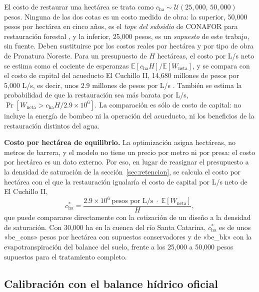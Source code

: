 El costo de restaurar una hectárea se trata como $c_{\text{ha}}\sim\mathcal U(25{,}000,\,50{,}000)$ pesos. Ninguna de las dos cotas es un costo medido de obra: la superior, 50,000 pesos por hectárea en cinco años, es el \emph{tope del subsidio} de CONAFOR para restauración forestal , y la inferior, 25,000 pesos, es un \emph{supuesto} de este trabajo, sin fuente. Deben sustituirse por los costos reales por hectárea y por tipo de obra de Pronatura Noreste. Para un presupuesto de $H$ hectáreas, el costo por L/s neto se estima como el cociente de esperanzas $\mathbb E[c_{\text{ha}}H]/\mathbb E[W_{\text{neta}}]$, y se compara con el costo de capital del acueducto El Cuchillo II, 14,680 millones de pesos por 5,000 L/s, es decir, unos 2.9 millones de pesos por L/s . También se estima la probabilidad de que la restauración sea más barata por L/s, $\Pr[W_{\text{neta}}>c_{\text{ha}}H/2.9\times10^6]$. La comparación es sólo de costo de capital: no incluye la energía de bombeo ni la operación del acueducto, ni los beneficios de la restauración distintos del agua.

\textbf{Costo por hectárea de equilibrio.} La optimización asigna hectáreas, no metros de barrera, y el modelo no tiene un precio por metro ni por presa: el costo por hectárea es un dato externo. Por eso, en lugar de reasignar el presupuesto a la densidad de saturación de la sección~\ref{sec:retencion}, se calcula el costo por hectárea con el que la restauración igualaría el costo de capital por L/s neto de El Cuchillo II,
\begin{equation}
c^{\ast}_{\text{ha}}=\frac{2.9\times10^6\ \text{pesos por L/s}\;\cdot\;\mathbb E[W_{\text{neta}}]}{H},
\end{equation}
que puede compararse directamente con la cotización de un diseño a la densidad de saturación. Con 30,000 ha en la cuenca del río Santa Catarina, $c^\ast_{\text{ha}}$ es de unos «be_cons» pesos por hectárea con supuestos conservadores y de «be_bk» con la evapotranspiración del balance del suelo, frente a los 25,000 a 50,000 pesos supuestos para el tratamiento completo.

\subsection{Calibración con el balance hídrico oficial}\label{sec:calibracion}

